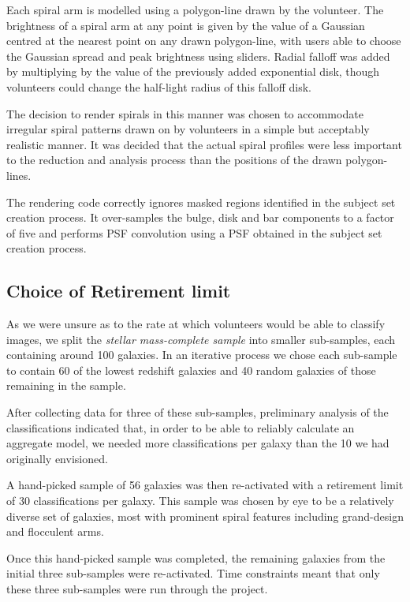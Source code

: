 \documentclass[../main.tex]{subfiles}
\begin{document}
Each spiral arm is modelled using a polygon-line drawn by the volunteer. The brightness of a spiral arm at any point is given by the value of a Gaussian centred at the nearest point on any drawn polygon-line, with users able to choose the Gaussian spread and peak brightness using sliders. Radial falloff was added by multiplying by the value of the previously added exponential disk, though volunteers could change the half-light radius of this falloff disk.

The decision to render spirals in this manner was chosen to accommodate irregular spiral patterns drawn on by volunteers in a simple but acceptably realistic manner. It was decided that the actual spiral profiles were less important to the reduction and analysis process than the positions of the drawn polygon-lines.

The rendering code correctly ignores masked regions identified in the subject set creation process. It over-samples the bulge, disk and bar components to a factor of five and performs PSF convolution using a PSF obtained in the subject set creation process.

\subsection{Choice of Retirement limit}

As we were unsure as to the rate at which volunteers would be able to classify images, we split the \textit{stellar mass-complete sample} into smaller sub-samples, each containing around 100 galaxies. In an iterative process we chose each sub-sample to contain 60 of the lowest redshift galaxies and 40 random galaxies of those remaining in the sample.

After collecting data for three of these sub-samples, preliminary analysis of the classifications indicated that, in order to be able to reliably calculate an aggregate model, we needed more classifications per galaxy than the 10 we had originally envisioned.

A hand-picked sample of 56 galaxies was then re-activated with a retirement limit of 30 classifications per galaxy. This sample was chosen by eye to be a relatively diverse set of galaxies, most with prominent spiral features including grand-design and flocculent arms.

Once this hand-picked sample was completed, the remaining galaxies from the initial three sub-samples were re-activated. Time constraints meant that only these three sub-samples were run through the project.
\end{document}
